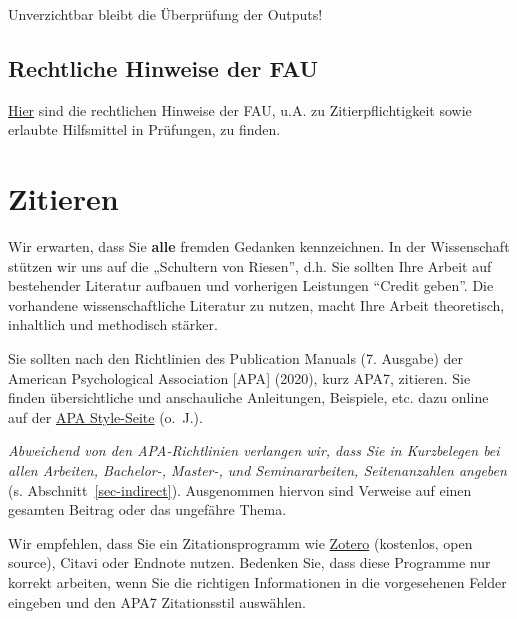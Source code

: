 \documentclass[
  letterpaper,
  DIV=11]{scrreprt}
\begin{document}
Unverzichtbar bleibt die Überprüfung der Outputs!

\section{Rechtliche Hinweise der FAU}\label{rechtliche-hinweise-der-fau}

\href{https://digitale-lehre.fau.de/digital-lehren/umsetzen/kuenstliche-intelligenz-in-der-lehre/}{Hier}
sind die rechtlichen Hinweise der FAU, u.A. zu Zitierpflichtigkeit sowie
erlaubte Hilfsmittel in Prüfungen, zu finden.

\chapter{Zitieren}\label{zitieren}

Wir erwarten, dass Sie \textbf{alle} fremden Gedanken kennzeichnen. In
der Wissenschaft stützen wir uns auf die „Schultern von Riesen'', d.h.
Sie sollten Ihre Arbeit auf bestehender Literatur aufbauen und
vorherigen Leistungen ``Credit geben''. Die vorhandene wissenschaftliche
Literatur zu nutzen, macht Ihre Arbeit theoretisch, inhaltlich und
methodisch stärker.

Sie sollten nach den Richtlinien des Publication Manuals (7. Ausgabe)
der American Psychological Association {[}APA{]} (2020), kurz APA7,
zitieren. Sie finden übersichtliche und anschauliche Anleitungen,
Beispiele, etc. dazu online auf der \href{https://apastyle.apa.org/}{APA
Style-Seite} (o.~J.).

\begin{tcolorbox}[enhanced jigsaw, rightrule=.15mm, colframe=quarto-callout-important-color-frame, opacityback=0, toptitle=1mm, colbacktitle=quarto-callout-important-color!10!white, breakable, titlerule=0mm, colback=white, arc=.35mm, toprule=.15mm, leftrule=.75mm, bottomtitle=1mm, coltitle=black, left=2mm, title=\textcolor{quarto-callout-important-color}{\faExclamation}\hspace{0.5em}{Wichtig}, bottomrule=.15mm, opacitybacktitle=0.6]

\emph{Abweichend von den APA-Richtlinien verlangen wir, dass Sie in
Kurzbelegen bei allen Arbeiten, Bachelor-, Master-, und Seminararbeiten,
Seitenanzahlen angeben} (s. Abschnitt~\ref{sec-indirect}). Ausgenommen
hiervon sind Verweise auf einen gesamten Beitrag oder das ungefähre
Thema.

\end{tcolorbox}

Wir empfehlen, dass Sie ein Zitationsprogramm wie
\href{https://www.zotero.org/}{Zotero} (kostenlos, open source), Citavi
oder Endnote nutzen. Bedenken Sie, dass diese Programme nur korrekt
arbeiten, wenn Sie die richtigen Informationen in die vorgesehenen
Felder eingeben und den APA7 Zitationsstil auswählen.
\end{document}
